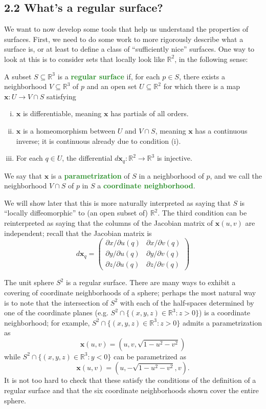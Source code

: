 \documentclass[10pt]{scrartcl}
\providecommand{\RR}{\mathbb R}
\providecommand{\ii}{\item}
\providecommand{\mb}[1]{\mathbf{#1}}
\providecommand{\vocab}[1]{{\textbf{\textcolor{ForestGreen}{#1}}}}
\begin{document}
\subsection{2.2 What's a regular surface?}
We want to now develop some tools that help us understand
the properties of surfaces. First, we need to do some work
to more rigorously describe what a surface is,
or at least to define a class of ``sufficiently nice'' surfaces.
One way to look at this is to consider sets that locally look like $\RR^2$,
in the following sense:
\begin{definition}
	A subset $S\subseteq\RR^3$ is a \vocab{regular surface}
	if, for each $p\in S$, there exists a neighborhood
	$V\subseteq \RR^3$ of $p$ and an open set $U\subseteq\RR^2$
	for which there is a map $\mb x\colon U\to V\cap S$ satisfying
	\begin{enumerate}[(i)]
		\ii $\mb x$ is differentiable, meaning $\mb x$
		has partials of all orders.
		\ii $\mb x$ is a homeomorphism between $U$ and $V\cap S$,
		meaning $\mb x$ has a continuous inverse; it is continuous already
		due to condition (i).
		\ii For each $q\in U$, the differential $d\mb x_q\colon\RR^2\to\RR^3$
		is injective.
	\end{enumerate}
	We say that $\mb x$ is a \vocab{parametrization} of $S$
	in a neighborhood of $p$, and we call the neighborhood
	$V\cap S$ of $p$ in $S$ a \vocab{coordinate neighborhood}.
\end{definition}

We will show later that this is more naturally interpreted as
saying that $S$ is ``locally diffeomorphic'' to (an open subset of) $\RR^2$.
The third condition can be reinterpreted as saying that
the columns of the Jacobian matrix of $\mb x(u, v)$ are independent;
recall that the Jacobian matrix is
\[d\mb x_q = \begin{pmatrix}
	\partial x/\partial u(q) & \partial x/\partial v(q)\\
	\partial y/\partial u(q)&\partial y/\partial v(q)\\
	\partial z/\partial u(q)&\partial z/\partial v(q)
\end{pmatrix}\]

\begin{example}
	The unit sphere $S^2$ is a regular surface. There are many ways to exhibit
	a covering of coordinate neighborhoods of a sphere;
	perhaps the most natural way is to note that the intersection of
	$S^2$ with each of the half-spaces determined by one of
	the coordinate planes (e.g. $S^2\cap \{(x,y,z)\in\RR^3 : z>0\}$)
	is a coordinate neighborhood; for example,
	$S^2\cap \{(x,y,z)\in\RR^3 : z>0\}$ admits a parametrization as
	\[\mb x(u, v) = (u, v,\sqrt{1-u^2-v^2})\]
	while $S^2\cap \{(x,y,z)\in\RR^3 : y<0\}$ can be parametrized as
	\[\mb x(u, v) = (u, -\sqrt{1-u^2-v^2},v).\]
	It is not too hard to check that these satisfy
	the conditions of the definition of a regular surface
	and that the six coordinate neighborhoods shown
	cover the entire sphere.
\end{example}
\end{document}
